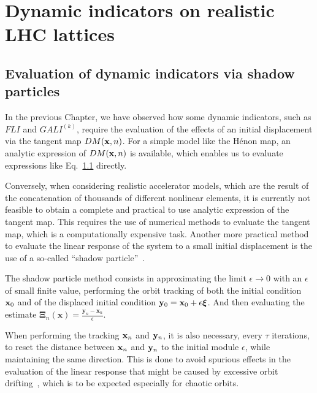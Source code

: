 \chapter{Dynamic indicators on realistic LHC lattices}

\section{Evaluation of dynamic indicators via shadow particles}

In the previous Chapter, we have observed how some dynamic indicators, such as $FLI$ and $GALI^{(k)}$, require the evaluation of the effects of an initial displacement via the tangent map $DM(\vb{x}, n)$. For a simple model like the Hénon map, an analytic expression of $DM(\vb{x}, n)$ is available, which enables us to evaluate expressions like Eq.~\ref{} directly.

Conversely, when considering realistic accelerator models, which are the result of the concatenation of thousands of different nonlinear elements, it is currently not feasible to obtain a complete and practical to use analytic expression of the tangent map. This requires the use of numerical methods to evaluate the tangent map, which is a computationally expensive task. Another more practical method to evaluate the linear response of the system to a small initial displacement is the use of a so-called ``shadow particle''~\cite{}.

The shadow particle method consists in approximating the limit $\epsilon\to 0$ with an $\epsilon$ of small finite value, performing the orbit tracking of both the initial condition $\vb{x}_0$ and of the displaced initial condition $\vb{y}_0 = \vb{x}_0 + \epsilon \boldsymbol{\xi}$. And then evaluating the estimate $\boldsymbol{\Xi}_{n}(\mathbf{x})=\frac{\mathbf{y}_{n}-\mathbf{x}_{n}}{\epsilon}$.

When performing the tracking $\vb{x}_n$ and $\vb{y}_n$, it is also necessary, every $\tau$ iterations, to reset the distance between $\vb{x}_n$ and $\vb{y}_n$ to the initial module $\epsilon$, while maintaining the same direction. This is done to avoid spurious effects in the evaluation of the linear response that might be caused by excessive orbit drifting~\cite{}, which is to be expected especially for chaotic orbits.


